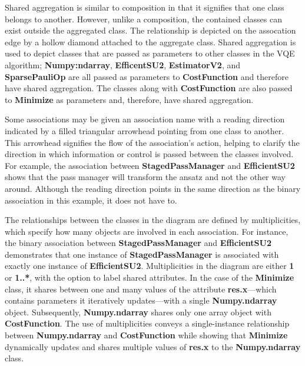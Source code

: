 \documentclass{article}
\begin{document}
{Shared aggregation is similar to composition in that it signifies that one class belongs to another\cite{Seidl_Scholz_Huemer_Kappel_Duffy_2014}. However, unlike a composition, the contained classes can exist outside the aggregated class. The relationship is depicted on the assocation edge by a hollow diamond attached to the aggregate class. Shared aggregation is used to depict classes that are passed as parameters to other classes in the VQE algorithm; \textbf{Numpy:ndarray}, \textbf{EfficentSU2}, \textbf{EstimatorV2}, and \textbf{SparsePauliOp} are all passed as parameters to \textbf{CostFunction} and therefore have shared aggregation. The classes along with \textbf{CostFunction} are also passed to \textbf{Minimize} as parameters and, therefore, have shared aggregation. 

Some associations may be given an association name with a reading direction indicated by a filled triangular arrowhead pointing from one class to another. This arrowhead signifies the flow of the association's action, helping to clarify the direction in which information or control is passed between the classes involved. For example, the association between \textbf{StagedPassManager} and \textbf{EfficientSU2} shows that the pass manager will transform the ansatz and not the other way around. Although the reading direction points in the same direction as the binary association in this example, it does not have to\cite{Seidl_Scholz_Huemer_Kappel_Duffy_2014}.

The relationships between the classes in the diagram are defined by multiplicities, which specify how many objects are involved in each association. For instance, the binary association between \textbf{StagedPassManager} and \textbf{EfficientSU2} demonstrates that one instance of \textbf{StagedPassManager} is associated with exactly one instance of \textbf{EfficientSU2}. Multiplicities in the diagram are either \textbf{1} or \textbf{1..*}, with the option to label shared attributes. In the case of the \textbf{Minimize} class, it shares between one and many values of the attribute \textbf{res.x}—which contains parameters it iteratively updates—with a single \textbf{Numpy.ndarray} object. Subsequently, \textbf{Numpy.ndarray} shares only one array object with \textbf{CostFunction}. The use of multiplicities conveys a single-instance relationship between \textbf{Numpy.ndarray} and \textbf{CostFunction} while showing that \textbf{Minimize} dynamically updates and shares multiple values of \textbf{res.x} to the \textbf{Numpy.ndarray} class.

}
\end{document}
